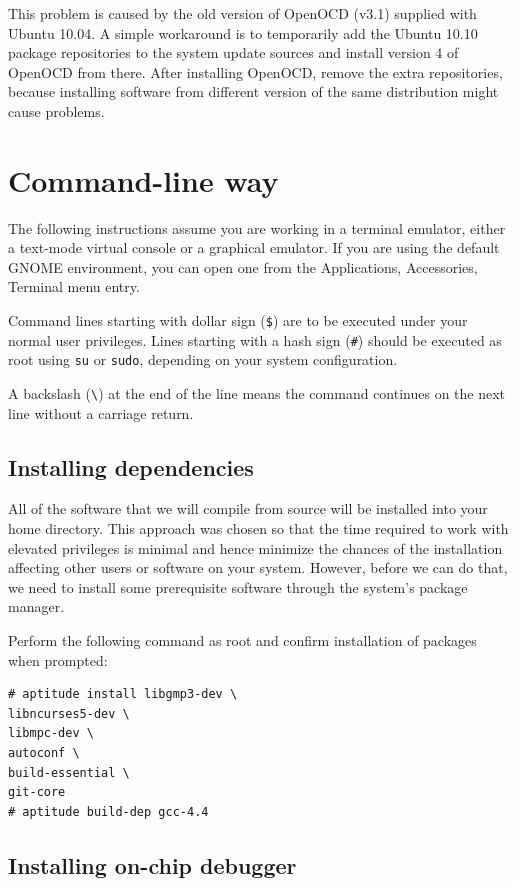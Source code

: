 \documentclass[a4paper, 10pt]{article}
\begin{document}
This problem is caused by the old version of OpenOCD (v3.1)
supplied with Ubuntu 10.04.
A simple workaround is to temporarily add the Ubuntu 10.10 package repositories
to the system update sources and install version 4 of OpenOCD from there.
After installing OpenOCD, remove the extra repositories,
because installing software from different version of the same distribution
might cause problems.


\newpage

\section{Command-line way}

The following instructions assume you are working in a terminal emulator,
either a text-mode virtual console or a graphical emulator. If you are using the
default GNOME environment, you can open one from the Applications, Accessories,
Terminal menu entry.

Command lines starting with dollar sign (\verb|$|) are to be executed under your
normal user privileges. Lines starting with a hash sign (\verb|#|) should be
executed as root using \verb|su| or \verb|sudo|, depending on your system
configuration.

A backslash (\verb|\|) at the end of the line means the command continues on the
next line without a carriage return.

\subsection{Installing dependencies}

All of the software that we will compile from source will be installed into
your home directory. This approach was chosen so that the time required to
work with elevated privileges is minimal and hence minimize the chances of the
installation affecting other users or software on your system. However, before
we can do that, we need to install some prerequisite software through the
system's package manager.

Perform the following command as root and confirm installation of packages
when prompted:

\begin{verbatim}
# aptitude install libgmp3-dev \
libncurses5-dev \
libmpc-dev \
autoconf \
build-essential \
git-core
# aptitude build-dep gcc-4.4
\end{verbatim}

\subsection{Installing on-chip debugger}
\end{document}
